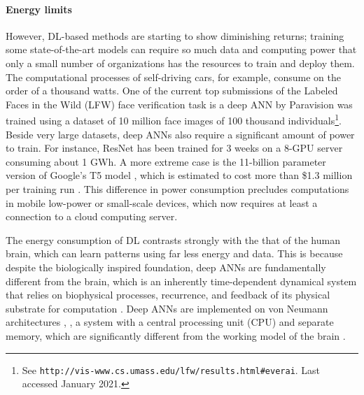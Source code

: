 \paragraph{Energy limits}
However, DL-based methods are starting to show diminishing returns; training some state-of-the-art models can require so much data and computing power that only a small number of organizations has the resources to train and deploy them.
The computational processes of self-driving cars, for example, consume on the order of a thousand watts.
One of the current top submissions of the Labeled Faces in the Wild (LFW) face verification task is a deep ANN by Paravision was trained using a dataset of 10 million face images of 100 thousand individuals\footnote{See \texttt{http://vis-www.cs.umass.edu/lfw/results.html\#everai}. Last accessed January 2021.}.
Beside very large datasets, deep ANNs also require a significant amount of power to train.
For instance, ResNet \citep{he2016deep} has been trained for 3 weeks on a 8-GPU server consuming about 1 GWh.
A more extreme case is the 11-billion parameter version of Google's T5 model \citep{raffel2019exploring}, which is estimated to cost more than \$1.3 million per training run \citep{sharir2020cost}.
This difference in power consumption precludes computations in mobile low-power or small-scale devices, which now requires at least a connection to a cloud computing server.

The energy consumption of DL contrasts strongly with the that of the human brain, which can learn patterns using far less energy and data.
This is because despite the biologically inspired foundation, deep ANNs are fundamentally different from the brain, which is an inherently time-dependent dynamical system \citep{sacramento2018dendritic, wozniak2020deep} that relies on biophysical processes, recurrence, and feedback of its physical substrate for computation \citep{sterling2015principles,bhalla2014molecular}.
Deep ANNs are implemented on von Neumann architectures \citep{von1993first}, \ie, a system with a central processing unit (CPU) and separate memory, which are significantly different from the working model of the brain \citep{schuman2017survey}.

